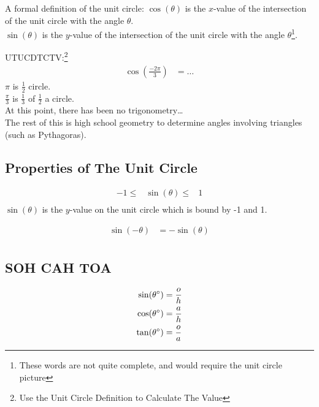 A formal definition of the unit circle:
$\cos(\theta)$ is the $x$-value of the intersection of the unit circle with the
angle $\theta$.\\
$\sin(\theta)$ is the $y$-value of the intersection of the unit circle with the
angle $\theta$\footnote{These words are not quite complete, and would require
the unit circle picture}.

UTUCDTCTV:\footnote{Use the Unit Circle Definition to Calculate The Value}
\begin{align}
  \cos(\frac{-2\pi}{3}) & = \ldots
\end{align}
$\pi$ is $\frac{1}{2}$ circle.\\
$\frac{\pi}{3}$ is $\frac{1}{3}$ of $\frac{1}{2}$ a circle.\\
At this point, there has been no trigonometry\ldots \\
The rest of this is high school geometry to determine angles involving
triangles (such as Pythagoras).

\subsection{Properties of The Unit Circle}
\label{sec:Properties of The Unit Circle}

\begin{align}
  -1 \leq & \sin(\theta) \leq & 1 \\
\end{align}
$\sin(\theta)$ is the $y$-value on the unit circle which is bound by -1 and 1.

\begin{align}
  \sin(-\theta) & = -\sin(\theta) \\
\end{align}

\subsection{SOH CAH TOA}
\label{sec:SOHCAHTOA}
\begin{align}
  \sin(\theta ^\circ) & = \frac{o}{h} \\
  \cos(\theta ^\circ) & = \frac{a}{h} \\
  \tan(\theta ^\circ) & = \frac{o}{a}
\end{align}

